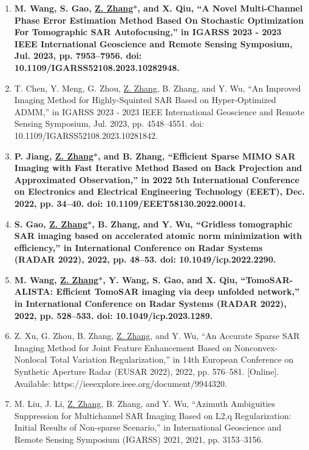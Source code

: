 \documentclass[paper=a4,fontsize=11pt]{scrartcl}
\begin{document}
\begin{enumerate}
	
	\item \textbf{ M. Wang, S. Gao, \underline{Z. Zhang$\ast$}, and X. Qiu, ``A Novel Multi-Channel Phase Error Estimation Method Based On Stochastic Optimization For Tomographic SAR Autofocusing,'' in IGARSS 2023 - 2023 IEEE International Geoscience and Remote Sensing Symposium, Jul. 2023, pp. 7953–7956. doi: 10.1109/IGARSS52108.2023.10282948.}
	
	\item T. Chen, Y. Meng, G. Zhou, \underline{Z. Zhang}, B. Zhang, and Y. Wu, ``An Improved Imaging Method for Highly-Squinted SAR Based on Hyper-Optimized ADMM,'' in IGARSS 2023 - 2023 IEEE International Geoscience and Remote Sensing Symposium, Jul. 2023, pp. 4548–4551. doi: 10.1109/IGARSS52108.2023.10281842.
	
	\item \textbf{P. Jiang, \underline{Z. Zhang$\ast$}, and B. Zhang, ``Efficient Sparse MIMO SAR Imaging with Fast Iterative Method Based on Back Projection and Approximated Observation,'' in 2022 5th International Conference on Electronics and Electrical Engineering Technology (EEET), Dec. 2022, pp. 34–40. doi: 10.1109/EEET58130.2022.00014.}
	
	\item \textbf{S. Gao, \underline{Z. Zhang$\ast$}, B. Zhang, and Y. Wu, ``Gridless tomographic SAR imaging based on accelerated atomic norm minimization with efficiency,'' in International Conference on Radar Systems (RADAR 2022), 2022, pp. 48–53. doi: 10.1049/icp.2022.2290.}
	
	\item \textbf{M. Wang, \underline{Z. Zhang$\ast$}, Y. Wang, S. Gao, and X. Qiu, ``TomoSAR-ALISTA: Efficient TomoSAR imaging via deep unfolded network,'' in International Conference on Radar Systems (RADAR 2022), 2022, pp. 528–533. doi: 10.1049/icp.2023.1289.}
	
	\item Z. Xu, G. Zhou, B. Zhang, \underline{Z. Zhang}, and Y. Wu, ``An Accurate Sparse SAR Imaging Method for Joint Feature Enhancement Based on Nonconvex-Nonlocal Total Variation Regularization,'' in 14th European Conference on Synthetic Aperture Radar (EUSAR 2022), 2022, pp. 576–581. [Online]. Available: https://ieeexplore.ieee.org/document/9944320.
	
	\item M. Liu, J. Li, \underline{Z. Zhang}, B. Zhang, and Y. Wu, ``Azimuth Ambiguities Suppression for Multichannel SAR Imaging Based on L2,q Regularization: Initial Results of Non-sparse Scenario,'' in International Geoscience and Remote Sensing Symposium (IGARSS) 2021, 2021, pp. 3153–3156.
	

\end{enumerate}
\end{document}
